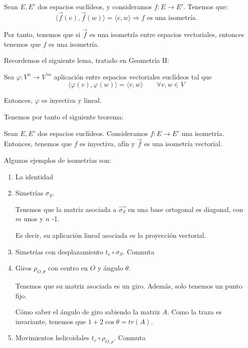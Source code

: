 \begin{prop}
    Sean $E,E'$ dos espacios euclídeos, y consideramos $f:E\to E'$. Tenemos que:
    \begin{equation*}
        \langle \vec{f}(v), \vec{f}(w)\rangle = \langle v,w\rangle \Longrightarrow f \text{ es una isometría.}
    \end{equation*}
\end{prop}
Por tanto, tenemos que si $\vec{f}$ es una isometría entre espacios vectoriales, entonces tenemos que $f$ es una isometría.

Recordemos el siguiente lema, tratado en Geometría II:
\begin{lema}
    Sea $\varphi:V^n\to V^{'m}$ aplicación entre espacios vectoriales euclídeos tal que
    $$\langle \varphi(v), \varphi(w)\rangle = \langle v,w\rangle \qquad \forall v,w\in V$$

    Entonces, $\varphi$ es inyectiva y lineal.
\end{lema}


Tenemos por tanto el siguiente teorema:
\begin{teo}
    Sean $E,E'$ dos espacios euclídeos. Consideramos $f:E\to E'$ una isometría. Entonces, tenemos que $f$ es inyectiva, afín y $\vec{f}$ es una isometría vectorial.
\end{teo}


\begin{ejemplo}
    Algunos ejemplos de isometrías son:
    \begin{enumerate}
        \item La identidad
        \item Simetrías $\sigma_S$.

        Tenemos que la matriz asociada a $\vec{\sigma_S}$ en una base ortogonal es diagonal, con $m$ unos y $n$ -1.

        Es decir, su aplicación lineal asociada es la proyección vectorial.
        
        \item Simetrías con desplazamiento $t_v\circ \sigma_S$. Conmuta

        \item Giros $\rho_{O,\theta}$ con centro en $O$ y ángulo $\theta$.
        
        Tenemos que su matriz asociada es un giro. Además, solo tenemos un punto fijo.


        Cómo saber el ángulo de giro sabiendo la matriz $A$. Como la traza es invariante, tenemos que $1+2\cos \theta = tr(A)$.

        \item Movimientos helicoidales $t_v\circ \rho_{O,\rho}$. Conmuta
    \end{enumerate}
\end{ejemplo}

